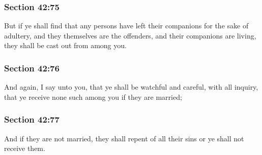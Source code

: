 	\subsubsection{Section 42:75} %
		\label{DC42-75}

		But if ye shall find that any persons have left their companions for the sake of adultery, and they themselves are the offenders, and their companions are living, they shall be cast out from among you.


	\subsubsection{Section 42:76} %
		\label{DC42-76}

		And again, I say unto you, that ye shall be watchful and careful, with all inquiry, that ye receive none such among you if they are married;


	\subsubsection{Section 42:77} %
		\label{DC42-77}

		And if they are not married, they shall repent of all their sins or ye shall not receive them.


